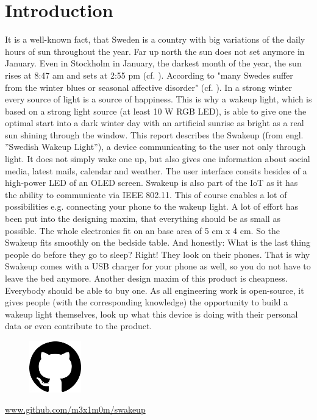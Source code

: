\chapter{Introduction} 
\label{chap:introduction} 
It is a well-known fact, that Sweden is a country with big variations of the
daily hours of sun throughout the year. Far up north the sun does not set
anymore in January. Even in Stockholm in January, the darkest month of the
year, the sun rises at 8:47 am and sets at 2:55 pm
(cf. \cite{other:visitsweden}). According to  "many Swedes
suffer from the winter blues or seasonal affective disorder" (cf.
\cite{other:sverigesradio}). In a strong winter every source of light is a
source of happiness. This is why a wakeup light, which is based on a strong
light source (at least 10 W RGB LED), is able to give one the optimal start into
a dark winter day with an artificial sunrise as bright as a real sun shining
through the window.  
\newpar
This report describes the Swakeup (from engl. ”Swedish Wakeup Light”), a device
communicating to the user not only through light. It does not simply wake one
up, but also gives one information about social media, latest mails, calendar
and weather. The user interface consits besides of a high-power LED of an OLED
screen. Swakeup is also part of the IoT as it has the ability to communicate
via IEEE 802.11. This of course enables a lot of possibilities e.g. connecting
your phone to the wakeup light. A lot of effort has been put into the designing
maxim, that everything should be as small as possible. The whole electronics
fit on an base area of 5 cm x 4 cm. So the Swakeup fits smoothly on the bedside
table. And honestly: What is the last thing people do before they go to sleep?
Right! They look on their phones. That is why Swakeup comes with a USB charger
for your phone as well, so you do not have to leave the bed anymore. Another
design maxim of this product is cheapness. Everybody should be able to buy one.
As all engineering work is open-source, it gives people (with the
corresponding knowledge) the opportunity to build a wakeup light themselves,
look up what this device is doing with their personal data or even contribute
to the product.

\begin{figure}[H]
		\centering
		\label{fig:block_simp}
		\includegraphics[width=0.2\textwidth]{./fig/github.jpg}
\end{figure}
\begin{center}
\url{www.github.com/m3x1m0m/swakeup}
\end{center}
